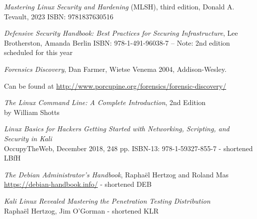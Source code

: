 \documentclass[Screen16to9,17pt]{foils}
\begin{document}

\emph{Mastering Linux Security and Hardening} (MLSH), third edition, Donald A. Tevault, 2023  ISBN: 9781837630516
{\footnotesize{}}



\emph{Defensive Security Handbook: Best Practices for Securing Infrastructure}, Lee Brotherston, Amanda Berlin ISBN: 978-1-491-96038-7 -- Note: 2nd edition scheduled for this year

{\footnotesize{}}



\emph{Forensics Discovery}, Dan Farmer, Wietse Venema 2004, Addison-Wesley.

Can be found at \url{http://www.porcupine.org/forensics/forensic-discovery/}




\begin{list2}
\item \emph{The Linux Command Line: A Complete Introduction}, 2nd Edition\\
 by William Shotts
\item \emph{Linux Basics for Hackers Getting Started with Networking, Scripting, and Security in Kali}\\
OccupyTheWeb, December 2018, 248 pp. ISBN-13: 978-1-59327-855-7 - shortened LBfH
\item \emph{The Debian Administrator’s Handbook}, Raphaël Hertzog and Roland Mas\\
\url{https://debian-handbook.info/} - shortened DEB
\item \emph{Kali Linux Revealed  Mastering the Penetration Testing Distribution}\\
Raphaël Hertzog, Jim O'Gorman - shortened KLR
\end{list2}





\end{document}
